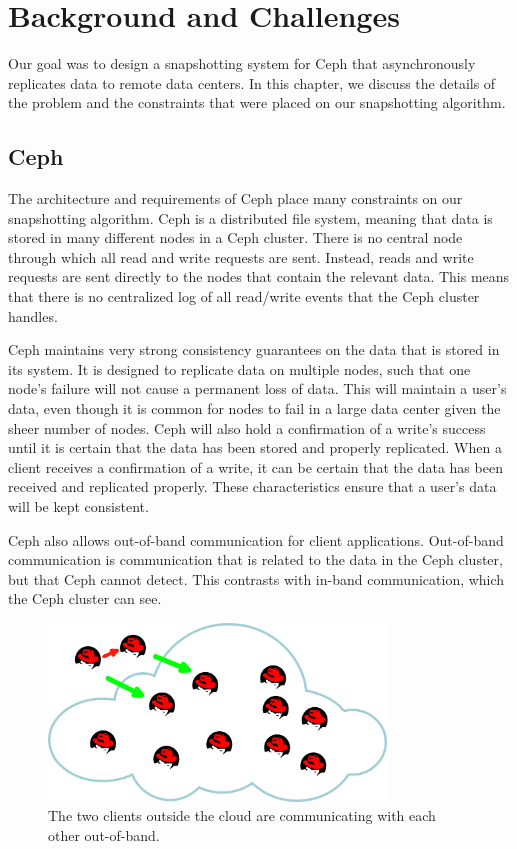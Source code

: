 \chapter{Background and Challenges}
\label{sec:description}

Our goal was to design a snapshotting system for Ceph that
asynchronously replicates data to remote data centers. In this
chapter, we discuss the details of the problem and the constraints
that were placed on our snapshotting algorithm.

\section{Ceph}

The architecture and requirements of Ceph place many constraints on
our snapshotting algorithm. Ceph is a distributed file system, meaning that data is
stored in many different nodes in a Ceph cluster. There is no central
node through which all read and write requests are sent.  Instead,
reads and write requests are sent directly to the nodes that contain
the relevant data. This means that there is no centralized log of all
read/write events that the Ceph cluster handles.

Ceph maintains very strong consistency guarantees on the data that is 
stored in its system. It is designed to replicate data on multiple nodes, such 
that one node's failure will not cause a permanent loss of data. This will 
maintain a user's data, even though it is common for nodes to fail in a large 
data center given the sheer number of nodes. Ceph will also hold a
confirmation of a write's success until it is certain that the data has been 
stored and properly replicated. When a client receives a confirmation of a write, it can be certain that the data has been received and replicated properly. These characteristics ensure that a user's 
data will be kept consistent.

Ceph also allows out-of-band communication for client applications. 
Out-of-band communication is communication that is related to the data in the 
Ceph cluster, but that Ceph cannot detect. This contrasts with in-band
communication, which the Ceph cluster can see. 

\begin{figure}[!htbp]
  \centering
  \caption{The two clients outside the cloud are communicating with each other out-of-band.} 
  \label{fig:out-of-band}
  \includegraphics[width=0.8\textwidth]{outofbandwrite.png}
\end{figure}

